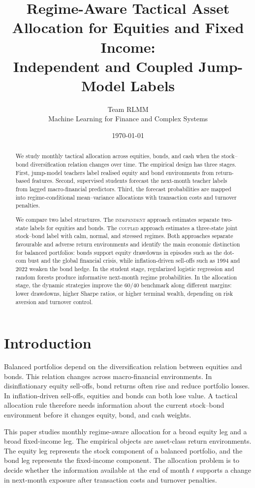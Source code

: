 \documentclass[10pt]{article}
\title{Regime-Aware Tactical Asset Allocation for Equities and Fixed Income:\\
Independent and Coupled Jump-Model Labels}
\author{%
Team RLMM\\
\normalsize Machine Learning for Finance and Complex Systems}
\date{\today}
\newcommand{\Acoup}{\textsc{coupled}}
\newcommand{\Bindep}{\textsc{independent}}
\begin{document}
\maketitle
\thispagestyle{empty}


\begin{abstract}
\noindent We study monthly tactical allocation across equities, bonds, and cash when the stock--bond diversification relation changes over time. The empirical design has three stages. First, jump-model teachers label realised equity and bond environments from return-based features. Second, supervised students forecast the next-month teacher labels from lagged macro-financial predictors. Third, the forecast probabilities are mapped into regime-conditional mean--variance allocations with transaction costs and turnover penalties.

\noindent We compare two label structures. The \Bindep{} approach estimates separate two-state labels for equities and bonds. The \Acoup{} approach estimates a three-state joint stock--bond label with calm, normal, and stressed regimes. Both approaches separate favourable and adverse return environments and identify the main economic distinction for balanced portfolios: bonds support equity drawdowns in episodes such as the dot-com bust and the global financial crisis, while inflation-driven sell-offs such as 1994 and 2022 weaken the bond hedge. In the student stage, regularized logistic regression and random forests produce informative next-month regime probabilities. In the allocation stage, the dynamic strategies improve the 60/40 benchmark along different margins: lower drawdowns, higher Sharpe ratios, or higher terminal wealth, depending on risk aversion and turnover control.
\end{abstract}

\section{Introduction}
Balanced portfolios depend on the diversification relation between equities and bonds. This relation changes across macro-financial environments. In disinflationary equity sell-offs, bond returns often rise and reduce portfolio losses. In inflation-driven sell-offs, equities and bonds can both lose value. A tactical allocation rule therefore needs information about the current stock--bond environment before it changes equity, bond, and cash weights.

This paper studies monthly regime-aware allocation for a broad equity leg and a broad fixed-income leg. The empirical objects are asset-class return environments. The equity leg represents the stock component of a balanced portfolio, and the bond leg represents the fixed-income component. The allocation problem is to decide whether the information available at the end of month \(t\) supports a change in next-month exposure after transaction costs and turnover penalties.
\end{document}
